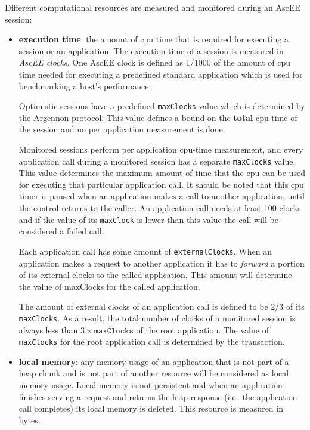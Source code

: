 Different computational resources are measured and monitored during an AscEE session:
\begin{itemize}
    \item \textbf{execution time}:
    the amount of cpu time that is required for executing a session or an application. The execution time of a session
    is measured in \emph{AscEE clocks}. One AscEE clock is defined as 1/1000 of the amount
    of cpu time needed for executing a predefined standard application which is used for benchmarking a host's
    performance.

    Optimistic sessions have a predefined \texttt{maxClocks} value which is determined by the Argennon protocol. This
    value defines a bound on the \textbf{total} cpu time of the session and no per application measurement is done.

    Monitored sessions perform per application cpu-time measurement, and every application call during a monitored
    session has a separate \texttt{maxClocks} value. This value determines the maximum amount of time that the cpu
    can be used for executing that particular application call. It should be noted that this cpu timer is paused when an
    application makes a call to another application, until the control returns to the caller. An application call
    needs at least 100 clocks and if the value of its \texttt{maxClock} is lower than this value the call will be
    considered a failed call.

    Each application call has some amount of \texttt{externalClocks}. When an application makes a request to another
    application it has to \emph{forward} a portion of its external clocks to the called application. This amount
    will determine the value of maxClocks for the called application.

    The amount of external clocks of an application
    call is defined to be \(2/3\) of its \texttt{maxClocks}. As a result, the total number of clocks of a monitored
    session is always less than \(3 \times \texttt{maxClocks}\) of the root application. The value of
    \texttt{maxClocks} for
    the root application call is determined by the transaction.

    \item \textbf{local memory}:
    any memory usage of an application that is not part of a heap chunk and is not part of another resource
    will be considered as local memory usage. Local memory is not persistent and when an application finishes serving a
    request and returns the http response (i.e.\ the application call completes) its local memory is deleted.
    This resource is measured in bytes.


\end{itemize}
